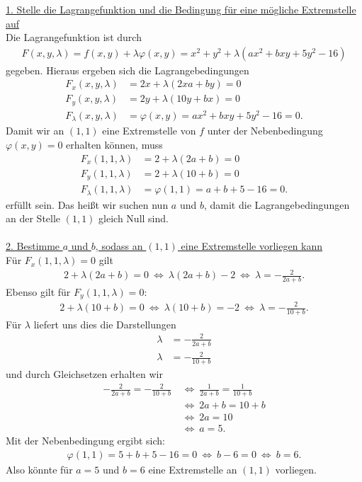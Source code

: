 \underline{1. Stelle die Lagrangefunktion und die Bedingung für eine mögliche Extremstelle auf }\\
Die Lagrangefunktion ist durch 
\begin{align*}
F(x,y,\lambda)
= f(x,y) + \lambda \varphi(x,y) 
=
x^2 +y^2 + \lambda (ax^2 +bxy+5y^2-16)
\end{align*}
gegeben.
Hieraus ergeben sich die Lagrangebedingungen
\begin{align*}
F_x(x,y,\lambda)
&=
2x +\lambda (2x a + by) = 0\\
F_y(x,y,\lambda)
&=
2y+\lambda(10 y +b x) = 0\\
F_\lambda(x,y,\lambda)
&=
\varphi(x,y) = ax^2 +bxy+5y^2 -16 = 0.
\end{align*}
Damit wir an $ (1,1) $ eine Extremstelle von $ f $ unter der Nebenbedingung $ \varphi(x,y) = 0 $ erhalten können, muss
\begin{align*}
F_x(1,1,\lambda)
&=
2 +\lambda (2 a + b) = 0\\
F_y(1,1,\lambda)
&=
2+\lambda(10  +b ) = 0\\
F_\lambda(1,1,\lambda)
&=
\varphi(1,1) = a +b+5 -16 = 0.
\end{align*}
erfüllt sein. Das heißt wir suchen nun $ a $ und $ b $, damit die Lagrangebedingungen an der Stelle $ (1,1) $ gleich Null sind.\\
\\
\underline{2. Bestimme $ a $ und $ b $, sodass an $ (1,1) $ eine Extremstelle vorliegen kann}\\
Für $ F_x(1,1,\lambda) = 0 $ gilt
\begin{align*}
2 +\lambda (2 a + b) = 0
\ \Leftrightarrow \
\lambda (2 a +b) -2
\ \Leftrightarrow \
\lambda = - \frac{2}{2a+b}.
\end{align*}
Ebenso gilt für $ F_y(1,1,\lambda) = 0 $:
\begin{align*}
2+\lambda(10  +b ) = 0
\ \Leftrightarrow \
\lambda(10  +b ) = -2
\ \Leftrightarrow \
\lambda = - \frac{2}{10  +b }.
\end{align*}
Für $ \lambda $ liefert uns dies die Darstellungen
\begin{align*}
\lambda &= - \frac{2}{2a +b}\\
\lambda &= - \frac{2}{10 + b }
\end{align*}
und durch Gleichsetzen erhalten wir
\begin{align*}
- \frac{2}{2a +b}
=
- \frac{2}{10 + b }
&\ \Leftrightarrow \
\frac{1}{2a +b} = \frac{1}{10 +b}\\
&\ \Leftrightarrow \
2a + b = 10 + b \\
&\ \Leftrightarrow \
2 a = 10\\
&\ \Leftrightarrow  \
a = 5.
\end{align*}
Mit der Nebenbedingung ergibt sich:
\begin{align*}
\varphi(1,1) = 
5  + b  +5 - 16 = 0
\ \Leftrightarrow \
b - 6 = 0
\ \Leftrightarrow \ 
b = 6.
\end{align*}
Also könnte für $ a = 5  $ und $ b = 6 $ eine Extremstelle an $ (1,1)  $ vorliegen.	
\newpage
